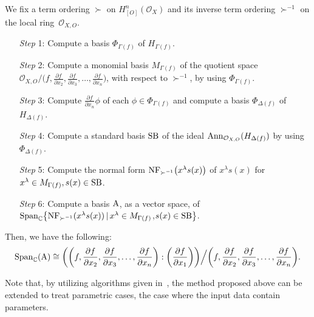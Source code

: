 \documentclass[10pt,a4paper]{amsart}
\numberwithin{equation}{section}
\begin{document}
We fix a term ordering $\succ$ on $H_{[O]}^n({\mathcal O}_X)$ and its inverse term ordering $\succ^{-1}$
on the local ring~${\mathcal O}_{X,O}$.
\begin{enumerate}\itemsep=0pt
\setlength{\leftskip}{0.45cm}

\item[{\it Step} 1:] Compute a basis $\Phi_{\Gamma(f)} $ of $ H_{\Gamma(f)}$.

\item[{\it Step} 2:] Compute a monomial basis $M_{\Gamma(f)}$ of the quotient space ${\mathcal O}_{X,O}/
\big(f, \frac{\partial f}{\partial x_2}, \frac{\partial f}{\partial x_3},\ldots,
\frac{\partial f}{\partial x_{n}}\big)$, with respect to $\succ^{-1}$, by using $\Phi_{\Gamma(f)}$.

\item[{\it Step} 3:] Compute $\frac{\partial f}{\partial x_n}\phi$ of each $\phi \in \Phi_{\Gamma(f)}$ and compute a basis $\Phi_{\Delta(f)}$ of $H_{\Delta(f)}$.

\item[{\it Step} 4:] Compute a standard basis ${\rm SB}$ of the ideal ${\rm Ann}_{{\mathcal O}_{X, O}}(H_{\Delta(f)})$ by using $\Phi_{\Delta(f)}$.

\item[{\it Step} 5:] Compute the normal form ${\rm NF}_{\succ^{-1}}\big(x^{\lambda} s(x)\big)$ of $x^{\lambda}s(x)$ for $x^{\lambda} \in M_{\Gamma(f)}, s(x) \in {\rm SB}$.

\item[{\it Step} 6:] Compute a basis $ {\rm A} $, as a vector space, of
${\rm Span}_{{\mathbb C}}\big\{ {\rm NF}_{\succ^{-1}}(x^{\lambda} s(x)) \,|\, x^{\lambda} \in M_{\Gamma(f)}$,\linebreak \mbox{$s(x) \in {\rm SB} \big\}$}.
\end{enumerate}
Then, we have the following:
\begin{gather*}
{\rm Span}_{{\mathbb C}}({\rm A}) \cong \bigg(\bigg(f, \frac{\partial f}{\partial x_2}, \frac{\partial f}{\partial x_3},\ldots,
\frac{\partial f}{\partial x_{n}}\bigg) : \bigg(\frac{\partial f}{\partial x_1}\bigg)\bigg)\Big/\bigg(f, \frac{\partial f}{\partial x_2}, \frac{\partial f}{\partial x_3},\ldots,
\frac{\partial f}{\partial x_{n}}\bigg).
\end{gather*}


Note that, by utilizing algorithms given in~\cite{NT17a}, the method proposed above can be extended to treat parametric cases,
the case where the input data contain parameters.
\end{document}
